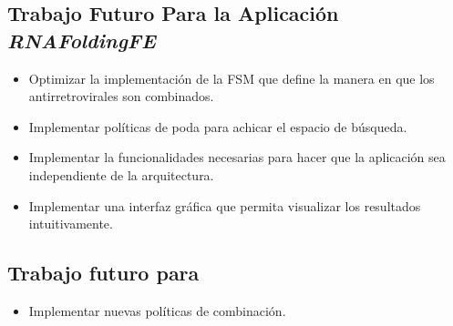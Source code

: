 \subsection{Trabajo Futuro Para la Aplicaci\'on \emph{RNAFoldingFE}}
\begin{itemize}
 \item Optimizar la implementaci\'on de la FSM que define la manera en que los antirretrovirales son combinados.
 \item Implementar pol\'iticas de poda para achicar el espacio de b\'usqueda.
 \item Implementar la funcionalidades necesarias para hacer que la aplicaci\'on sea independiente de la arquitectura.
 \item Implementar una interfaz gr\'afica que permita visualizar los resultados intuitivamente.
\end{itemize}

\subsection{Trabajo futuro para \combeng}
\begin{itemize}
  \item Implementar nuevas pol\'iticas de combinaci\'on.
\end{itemize}
